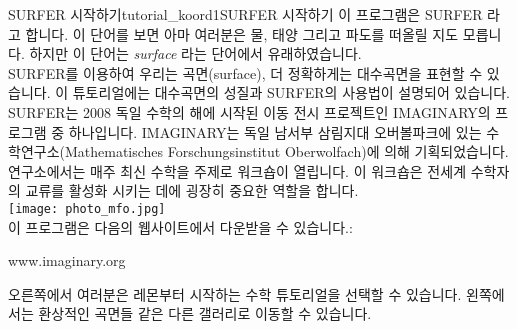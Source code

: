 \begin{surferIntroPage}{SURFER 시작하기}{tutorial_koord1}{SURFER 시작하기}
이 프로그램은 SURFER 라고 합니다. 이 단어를 보면 아마 여러분은 물, 태양 그리고 파도를 떠올릴 지도 모릅니다. 하지만 이 단어는 {\it surface} 라는 단어에서 유래하였습니다.
\\
SURFER를 이용하여 우리는 곡면(surface), 더 정확하게는 대수곡면을 표현할 수 있습니다. 
이 튜토리얼에는 대수곡면의 성질과 SURFER의 사용법이 설명되어 있습니다.\\
SURFER는 2008 독일 수학의 해에 시작된 이동 전시 프로젝트인 IMAGINARY의 프로그램 중 하나입니다. IMAGINARY는 독일 남서부 삼림지대 오버볼파크에 있는 수학연구소(Mathematisches Forschungsinstitut Oberwolfach)에 의해 기획되었습니다. 연구소에서는 매주 최신 수학을 주제로 워크숍이 열립니다. 이 워크숍은 전세계 수학자의 교류를 활성화 시키는 데에 굉장히 중요한 역할을 합니다.\\
\vspace{0.2cm} \hspace{3.5cm}\texttt{[image: photo\_mfo.jpg]}\\
이 프로그램은 다음의 웹사이트에서 다운받을 수 있습니다.: \\
\begin{centering}
www.imaginary.org\\
\end{centering}
 \vspace{0.2cm}
오른쪽에서 여러분은 레몬부터 시작하는 수학 튜토리얼을 선택할 수 있습니다. 왼쪽에서는 환상적인 곡면들 같은 다른 갤러리로 이동할 수 있습니다.
\end{surferIntroPage}
